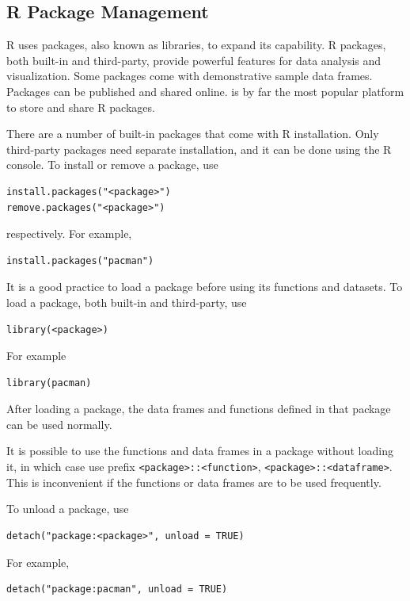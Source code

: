 \subsection{R Package Management} \label{ch:r1:sec:rpackage}

R uses packages, also known as libraries, to expand its capability. R packages, both built-in and third-party, provide powerful features for data analysis and visualization. Some packages come with demonstrative sample data frames. Packages can be published and shared online.  is by far the most popular platform to store and share R packages.

There are a number of built-in packages that come with R installation. Only third-party packages need separate installation, and it can be done using the R console. To install or remove a package, use
\begin{lstlisting}
install.packages("<package>")
remove.packages("<package>")
\end{lstlisting}
respectively. For example,
\begin{lstlisting}
install.packages("pacman")
\end{lstlisting}

It is a good practice to load a package before using its functions and datasets. To load a package, both built-in and third-party, use
\begin{lstlisting}
library(<package>)
\end{lstlisting}
For example
\begin{lstlisting}
library(pacman)
\end{lstlisting}
After loading a package, the data frames and functions defined in that package can be used normally. 

It is possible to use the functions and data frames in a package without loading it, in which case use prefix \verb|<package>::<function>|, \verb|<package>::<dataframe>|. This is inconvenient if the functions or data frames are to be used frequently.

To unload a package, use
\begin{lstlisting}
detach("package:<package>", unload = TRUE)
\end{lstlisting}
For example,
\begin{lstlisting}
detach("package:pacman", unload = TRUE)
\end{lstlisting}


